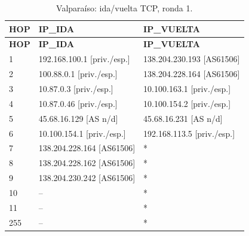 \endgroup
\begingroup
\fontsize{9}{11}\selectfont
\begin{longtable}{p{0.95cm}p{7.075cm}p{7.075cm}}
\caption{Valparaíso: ida/vuelta TCP, ronda 1.}\label{anexo:vuelta:138.204.230.242:TCP:1} \\
\toprule
\textbf{HOP} & \textbf{IP\_\allowbreak{}IDA} & \textbf{IP\_\allowbreak{}VUELTA} \\ \midrule
\endfirsthead
\toprule
\textbf{HOP} & \textbf{IP\_\allowbreak{}IDA} & \textbf{IP\_\allowbreak{}VUELTA} \\ \midrule
\endhead
1 & 192.168.100.1 [priv./esp.] & 138.204.230.193 [AS61506] \\
2 & 100.88.0.1 [priv./esp.] & 138.204.228.164 [AS61506] \\
3 & 10.87.0.3 [priv./esp.] & 10.100.163.1 [priv./esp.] \\
4 & 10.87.0.46 [priv./esp.] & 10.100.154.2 [priv./esp.] \\
5 & 45.68.16.129 [AS n/d] & 45.68.16.231 [AS n/d] \\
6 & 10.100.154.1 [priv./esp.] & 192.168.113.5 [priv./esp.] \\
7 & 138.204.228.164 [AS61506] & * \\
8 & 138.204.228.162 [AS61506] & * \\
9 & 138.204.230.242 [AS61506] & * \\
10 & -- & * \\
11 & -- & * \\
255 & -- & * \\
\bottomrule
\end{longtable}
\endgroup
\begingroup
\fontsize{8}{10}\selectfont
